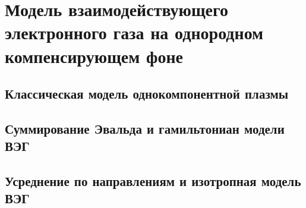 \chapter{Модель взаимодействующего электронного газа на однородном компенсирующем фоне}

\section{Классическая модель однокомпонентной плазмы}

\section{Суммирование Эвальда и гамильтониан модели ВЭГ}

\section{Усреднение по направлениям и изотропная модель ВЭГ}

